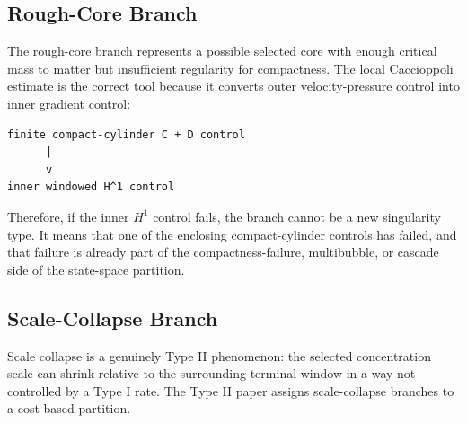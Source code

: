 \documentclass[11pt]{amsart}
\begin{document}
\subsection{Rough-Core Branch}

The rough-core branch represents a possible selected core with enough critical mass to matter but insufficient regularity for compactness.  The local Caccioppoli estimate is the correct tool because it converts outer velocity-pressure control into inner gradient control:

\begin{center}
\begin{minipage}{0.92\linewidth}
\scriptsize
\begin{verbatim}
finite compact-cylinder C + D control
      |
      v
inner windowed H^1 control
\end{verbatim}
\end{minipage}
\end{center}

Therefore, if the inner \(H^1\) control fails, the branch cannot be a new singularity type.  It means that one of the enclosing compact-cylinder controls has failed, and that failure is already part of the compactness-failure, multibubble, or cascade side of the state-space partition.

\subsection{Scale-Collapse Branch}

Scale collapse is a genuinely Type II phenomenon: the selected concentration scale can shrink relative to the surrounding terminal window in a way not controlled by a Type I rate.  The Type II paper assigns scale-collapse branches to a cost-based partition.
\end{document}

